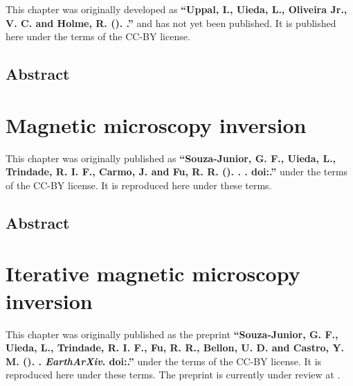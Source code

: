 \documentclass[10pt,a4paper,oneside]{book}
\begin{document}
\begin{summarybox}
    \noindent
    This chapter was originally developed as
    \textbf{``Uppal, I., Uieda, L., Oliveira Jr., V. C. and Holme, R. (\Year).
    \Title{}.''} and has not yet been published.
    It is published here under the terms of the CC-BY license.
\end{summarybox}

\section*{Abstract}



\endgroup

\chapter{Magnetic microscopy inversion}

\begingroup


\begin{summarybox}
    \noindent
    This chapter was originally published as
    \textbf{``Souza-Junior, G. F., Uieda, L., Trindade, R. I. F., Carmo, J. and
        Fu, R. R. (\Year). \Title{}. \textit{\Journal{}}.
    doi:\href{https://doi.org/\JournalDOI}{\JournalDOI}.''} under the
    terms of the CC-BY license. It is reproduced here under these terms.
\end{summarybox}

\section*{Abstract}


% 
\endgroup

\chapter{Iterative magnetic microscopy inversion}

\begingroup


\begin{summarybox}
    \noindent
    This chapter was originally published as the preprint
    \textbf{``Souza-Junior, G. F., Uieda, L., Trindade, R. I. F., Fu, R. R.,
    Bellon, U. D. and Castro, Y. M. (\Year). \Title{}. \textit{EarthArXiv}.
    doi:\href{https://doi.org/\PreprintDOI}{\PreprintDOI}.''} under the
    terms of the CC-BY license. It is reproduced here under these terms.
    The preprint is currently under review at \textit{\Journal{}}.
\end{summarybox}
\end{document}
